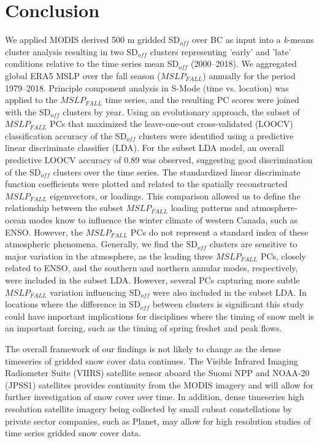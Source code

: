 \documentclass{tATO2e}
\newcommand{\sdoff}{SD$_{off}$}
\begin{document}
\section{Conclusion}
 We applied MODIS derived 500 m gridded \sdoff{} over BC as input into a \textit{k}-means cluster analysis resulting in two \sdoff{} clusters representing 'early' and 'late' conditions relative to the time series mean \sdoff{} (2000--2018). We aggregated global ERA5 MSLP over the fall season ($MSLP_{FALL}$) annually for the period 1979--2018. Principle component analysis in S-Mode (time vs. location) was applied to the $MSLP_{FALL}$ time series, and the resulting PC scores were joined with the \sdoff{} clusters by year. Using an evolutionary approach, the subset of $MSLP_{FALL}$ PCs that maximized the leave-one-out cross-validated (LOOCV) classification accuracy of the \sdoff{} clusters were identified using a predictive linear discriminate classifier (LDA). For the subset LDA model, an overall predictive LOOCV accuracy of 0.89 was observed, suggesting good discrimination of the \sdoff{} clusters over the time series. The standardized linear discriminate function coefficients were plotted and related to the spatially reconstructed $MSLP_{FALL}$ eigenvectors, or loadings. This comparison allowed us to define the relationship between the subset $MSLP_{FALL}$ loading patterns and atmosphere-ocean modes know to influence the winter climate of western Canada, such as ENSO. However, the $MSLP_{FALL}$ PCs do not represent a standard index of these atmospheric phenomena. Generally, we find the \sdoff{} clusters are sensitive to major variation in the atmosphere, as the leading three $MSLP_{FALL}$ PCs, closely related to ENSO, and the southern and northern annular modes, respectively, were included in the subset LDA. However, several PCs capturing more subtle $MSLP_{FALL}$ variation influencing \sdoff{} were also included in the subset LDA. In locations where the difference in \sdoff{} between clusters is significant this study could have important implications for disciplines where the timing of snow melt is an important forcing, such as the timing of spring freshet and peak flows.
\par
The overall framework of our findings is not likely to change as the dense timeseries of gridded snow cover data continues. The Visible Infrared Imaging Radiometer Suite (VIIRS) satellite sensor aboard the Suomi NPP and NOAA-20 (JPSS1) satellites provides continuity from the MODIS imagery and will allow for further investigation of snow cover over time. In addition, dense timeseries high resolution satellite imagery being collected by small cubsat constellations by private sector companies, such as Planet, may allow for high resolution studies of time series gridded snow cover data. 
\end{document}

